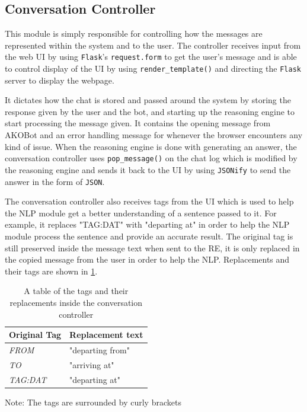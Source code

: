 \documentclass[11pt]{article}
\newcommand{\code}[1]{{\texttt{#1}}}
\begin{document}
    \subsection{Conversation Controller}\label{sec:convcontDesign}
    This module is simply responsible for controlling how the messages are represented within the system and to the user. The controller receives input from the web UI by using \code{Flask}'s \code{request.form} to get the user's message and is able to control display of the UI by using \code{render\_template()} and directing the \code{Flask} server to display the webpage.
    
    It dictates how the chat is stored and passed around the system by storing the response given by the user and the bot, and starting up the reasoning engine to start processing the message given. It contains the opening message from AKOBot and an error handling message for whenever the browser encounters any kind of issue. When the reasoning engine is done with generating an answer, the conversation controller uses \code{pop\_message()} on the chat log which is modified by the reasoning engine and sends it back to the UI by using \code{JSONify} to send the answer in the form of \code{JSON}.
    
    The conversation controller also receives tags from the UI which is used to help the NLP module get a better understanding of a sentence passed to it. For example, it replaces "{TAG:DAT}" with "departing at" in order to help the NLP module process the sentence and provide an accurate result. The original tag is still preserved inside the message text when sent to the RE, it is only replaced in the copied message from the user in order to help the NLP. Replacements and their tags are shown in \cref{tab:DesignConvContTag}.
    
    \begin{table}[!ht]
    \centering
\begin{tabular}{|l|l|}
\hline
\textbf{Original Tag} & \textbf{Replacement text} \\ \hline
\textit{FROM}        & "departing from"     \\ \hline
\textit{TO}          & "arriving at"        \\ \hline
\textit{TAG:DAT}          & "departing at"       \\ \hline
\end{tabular}
\caption{A table of the tags and their replacements inside the conversation controller}
Note: The tags are surrounded by curly brackets
\label{tab:DesignConvContTag}
\end{table}
    
\end{document}
